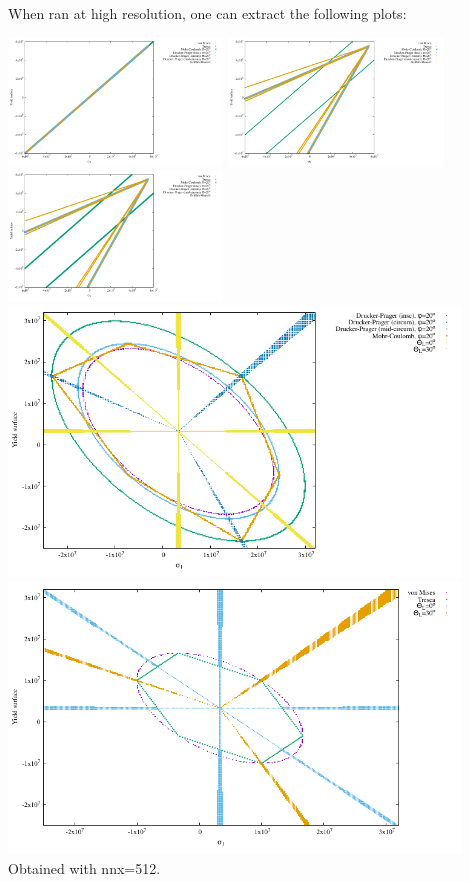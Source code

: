 When ran at high resolution, one can extract the following plots:
\begin{center}
\includegraphics[width=5.7cm]{python_codes/fieldstone_159/images/surfaces_xy.pdf}
\includegraphics[width=5.7cm]{python_codes/fieldstone_159/images/surfaces_xz.pdf}
\includegraphics[width=5.7cm]{python_codes/fieldstone_159/images/surfaces_yz.pdf}\\
\includegraphics[width=12cm]{python_codes/fieldstone_159/images/surfaces_plane.pdf}
\includegraphics[width=12cm]{python_codes/fieldstone_159/images/surfaces_plane2.pdf}\\
{\captionfont Obtained with nnx=512}.
\end{center}

